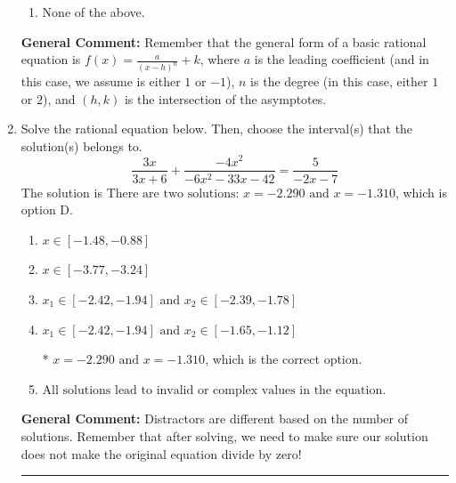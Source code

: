 \documentclass{extbook}[14pt]
\newcommand{\litem}[1]{\item #1

\rule{\textwidth}{0.4pt}}
\begin{document}
\begin{enumerate}
{\begin{enumerate}[label=\Alph*.]
\item None of the above.\end{enumerate}
\textbf{General Comment:} Remember that the general form of a basic rational equation is $ f(x) = \frac{a}{(x-h)^n} + k$, where $a$ is the leading coefficient (and in this case, we assume is either $1$ or $-1$), $n$ is the degree (in this case, either $1$ or $2$), and $(h, k)$ is the intersection of the asymptotes.
}
\litem{
Solve the rational equation below. Then, choose the interval(s) that the solution(s) belongs to.
\[ \frac{3x}{3x + 6} + \frac{-4x^{2}}{-6x^{2} -33 x -42} = \frac{5}{-2x -7} \]The solution is \( \text{There are two solutions: } x = -2.290 \text{ and } x = -1.310 \), which is option D.\begin{enumerate}[label=\Alph*.]
\item \( x \in [-1.48,-0.88] \)


\item \( x \in [-3.77,-3.24] \)


\item \( x_1 \in [-2.42, -1.94] \text{ and } x_2 \in [-2.39,-1.78] \)


\item \( x_1 \in [-2.42, -1.94] \text{ and } x_2 \in [-1.65,-1.12] \)

* $x = -2.290 \text{ and } x = -1.310$, which is the correct option.
\item \( \text{All solutions lead to invalid or complex values in the equation.} \)


\end{enumerate}

\textbf{General Comment:} Distractors are different based on the number of solutions. Remember that after solving, we need to make sure our solution does not make the original equation divide by zero!
}
\end{enumerate}
\end{document}

